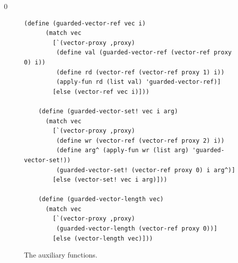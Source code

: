 \documentclass[7x10]{TimesAPriori_MIT}%
\def\racketEd{0}
\def\pythonEd{1}
\def\edition{0}
\numberwithin{theorem}{chapter}
\numberwithin{definition}{chapter}
\numberwithin{equation}{chapter}
\begin{document}
{\if\edition\racketEd    
\begin{figure}[tbp]
\begin{tcolorbox}[colback=white]  
\begin{lstlisting}[basicstyle=\ttfamily\footnotesize]
    (define (guarded-vector-ref vec i)
      (match vec
        [`(vector-proxy ,proxy)
         (define val (guarded-vector-ref (vector-ref proxy 0) i))
         (define rd (vector-ref (vector-ref proxy 1) i))
         (apply-fun rd (list val) 'guarded-vector-ref)]
        [else (vector-ref vec i)]))
        
    (define (guarded-vector-set! vec i arg)
      (match vec
        [`(vector-proxy ,proxy)
         (define wr (vector-ref (vector-ref proxy 2) i))
         (define arg^ (apply-fun wr (list arg) 'guarded-vector-set!))
         (guarded-vector-set! (vector-ref proxy 0) i arg^)]
        [else (vector-set! vec i arg)]))
        
    (define (guarded-vector-length vec)
      (match vec
        [`(vector-proxy ,proxy)
         (guarded-vector-length (vector-ref proxy 0))]
        [else (vector-length vec)]))
\end{lstlisting}
\end{tcolorbox}

\caption{The  auxiliary functions.}
  \label{fig:guarded-tuple}
\end{figure}
\fi}
\end{document}
